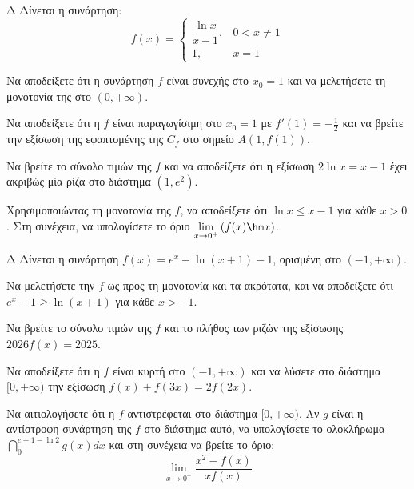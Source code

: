 \begin{thema}{Δ}
Δίνεται η συνάρτηση:
\[ f(x) = \begin{cases} 
\dfrac{\ln x}{x-1}, & 0 < x \neq 1 \\[2ex]
1, & x = 1 
\end{cases} \]
\begin{erwthma}
    \item Να αποδείξετε ότι η συνάρτηση $f$ είναι συνεχής στο $x_0 = 1$ και να μελετήσετε τη μονοτονία της στο $(0, +\infty)$.
    \item Να αποδείξετε ότι η $f$ είναι παραγωγίσιμη στο $x_0 = 1$ με $f'(1) = -\frac{1}{2}$ και να βρείτε την εξίσωση της εφαπτομένης της $C_f$ στο σημείο $A(1, f(1))$.
    \item Να βρείτε το σύνολο τιμών της $f$ και να αποδείξετε ότι η εξίσωση $2\ln x = x - 1$ έχει ακριβώς μία ρίζα στο διάστημα $(1, e^2)$.
    \item Χρησιμοποιώντας τη μονοτονία της $f$, να αποδείξετε ότι $\ln x \le x - 1$ για κάθε $x > 0$. Στη συνέχεια, να υπολογίσετε το όριο $\displaystyle \lim_{x\to 0^+} \left( f(x) \hm x \right)$.
\end{erwthma}
\end{thema}

\begin{thema}{Δ}
Δίνεται η συνάρτηση $\displaystyle f(x) = e^x - \ln(x+1) - 1$, ορισμένη στο $(-1, +\infty)$.
\begin{erwthma}
    \item Να μελετήσετε την $f$ ως προς τη μονοτονία και τα ακρότατα, και να αποδείξετε ότι $e^x - 1 \ge \ln(x+1)$ για κάθε $x > -1$.
    \item Να βρείτε το σύνολο τιμών της $f$ και το πλήθος των ριζών της εξίσωσης $2026 f(x) = 2025$.
    \item Να αποδείξετε ότι η $f$ είναι κυρτή στο $(-1, +\infty)$ και να λύσετε στο διάστημα $[0, +\infty)$ την εξίσωση $f(x) + f(3x) = 2f(2x)$.
    \item Να αιτιολογήσετε ότι η $f$ αντιστρέφεται στο διάστημα $[0, +\infty)$. Αν $g$ είναι η αντίστροφη συνάρτηση της $f$ στο διάστημα αυτό, να υπολογίσετε το ολοκλήρωμα $\displaystyle \dint_0^{e-1-\ln 2} g(x) dx$ και στη συνέχεια να βρείτε το όριο:
    \[ \lim_{x\to 0^+} \frac{x^2 - f(x)}{x f(x)} \]
\end{erwthma}
\end{thema}

